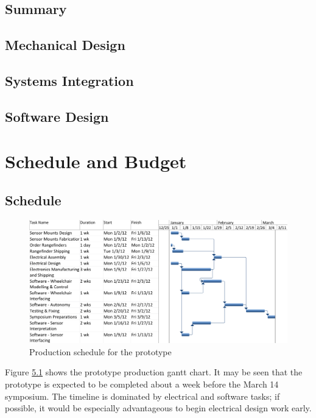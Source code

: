 \documentclass[oneside,final]{report}
\begin{document}
\section{Summary}

\section{Mechanical Design}

\section{Systems Integration}

\section{Software Design}

\chapter{Schedule and Budget}

\section{Schedule}
\begin{figure}[htb]
 \centering
 \includegraphics[scale=0.6]{gantt.png}
 \caption{Production schedule for the prototype}
 \label{schedule}
\end{figure}

Figure \ref{schedule} shows the prototype production gantt chart.  It may be seen that the prototype is expected to be completed about a week before the March 14 symposium.  The timeline is dominated by electrical and software tasks; if possible, it would be especially advantageous to begin electrical design work early.
\end{document}
